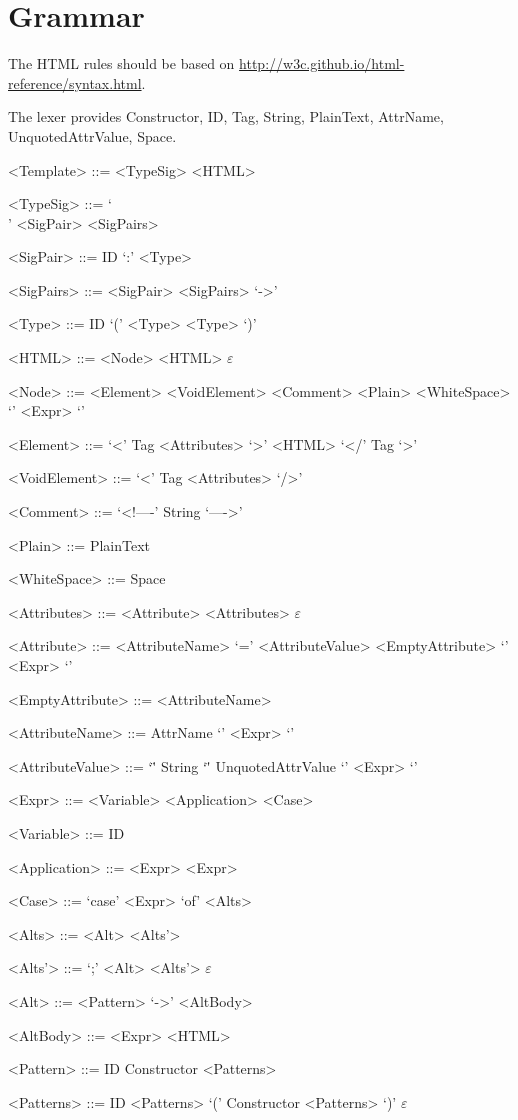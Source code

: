 \documentclass{report}
\begin{document}
\setlength{\grammarparsep}{4pt} %
\setlength{\grammarindent}{12em} %

\section*{Grammar}

The HTML rules should be based on
\url{http://w3c.github.io/html-reference/syntax.html}.

The lexer provides Constructor, ID, Tag, String, PlainText,
AttrName, UnquotedAttrValue, Space.

\begin{grammar}

<Template> ::= <TypeSig> <HTML>

<TypeSig> ::= `\\' <SigPair> <SigPairs>

<SigPair> ::= ID `:' <Type>

<SigPairs> ::= <SigPair> <SigPairs>
\alt `->'

<Type> ::= ID
\alt `(' <Type> <Type> `)'

<HTML> ::= <Node> <HTML>
\alt $\varepsilon$

<Node> ::= <Element>
\alt <VoidElement>
\alt <Comment>
\alt <Plain>
\alt <WhiteSpace>
\alt `{' <Expr> `}'

<Element> ::= `<' Tag <Attributes> `>' <HTML> `</' Tag `>'

<VoidElement> ::= `<' Tag <Attributes> `/>'

<Comment> ::= `<!----' String `---->'

<Plain> ::= PlainText

<WhiteSpace> ::= Space

<Attributes> ::= <Attribute> <Attributes>
\alt $\varepsilon$

<Attribute> ::= <AttributeName> `=' <AttributeValue>
\alt <EmptyAttribute>
\alt `{' <Expr> `}'

<EmptyAttribute> ::= <AttributeName>

<AttributeName> ::= AttrName
\alt `{' <Expr> `}'

<AttributeValue> ::= `\"' String `\"'
\alt UnquotedAttrValue
\alt `{' <Expr> `}'

<Expr> ::= <Variable>
\alt <Application>
\alt <Case>

<Variable> ::= ID

<Application> ::= <Expr> <Expr>

<Case> ::= `case' <Expr> `of' <Alts>

<Alts> ::= <Alt> <Alts'>

<Alts'> ::= `;' <Alt> <Alts'>
\alt $\varepsilon$

<Alt> ::= <Pattern> `->' <AltBody>

<AltBody> ::= <Expr>
\alt <HTML>

<Pattern> ::= ID
\alt Constructor <Patterns>

<Patterns> ::= ID <Patterns>
\alt `(' Constructor <Patterns> `)'
\alt $\varepsilon$


\end{grammar}
\end{document}
